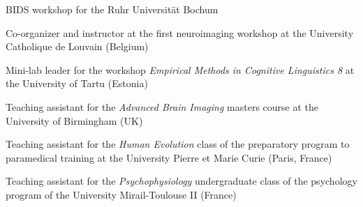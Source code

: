 
BIDS workshop for the Ruhr Universität Bochum

Co-organizer and instructor at the first neuroimaging workshop
at the University Catholique de Louvain (Belgium)

Mini-lab leader for the workshop \textit{Empirical Methods in Cognitive Linguistics 8}
at the University of Tartu (Estonia)

Teaching assistant for the \textit{Advanced Brain Imaging} masters course
at the University of Birmingham (UK)

Teaching assistant for the \textit{Human Evolution} class of the preparatory program
to paramedical training at the University Pierre et Marie Curie (Paris, France)

Teaching assistant for the \textit{Psychophysiology} undergraduate class
of the psychology program of the University Mirail-Toulouse II (France)
